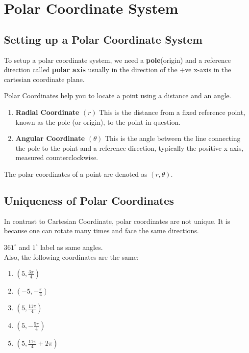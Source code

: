 \chapter{Polar Coordinate System}
\label{cha:polar-coord-syst}

\section{Setting up a Polar Coordinate System}
\label{sec:polar-coord-syst}

To setup a polar coordinate system, we need a \textbf{pole}(origin) and a
reference direction called \textbf{polar axis} usually in the direction of the
+ve x-axis in the cartesian coordinate plane.


\begin{note}
  Polar Coordinates help you to locate a point using a distance and an angle.
  \begin{enumerate}
    \item \textbf{Radial Coordinate \( (r) \) } This is the distance from a
      fixed reference point, known as the pole (or origin), to the point in
      question.
    \item \textbf{Angular Coordinate \( (\theta) \)} This is the angle between
      the line connecting the pole to the point and a reference direction,
      typically the positive x-axis, measured counterclockwise.
  \end{enumerate}

  The polar coordinates of a point are denoted as \( (r,\theta) \).
\end{note}

\section{Uniqueness of Polar Coordinates}
\label{sec:uniq-polar-coord}
In contrast to Cartesian Coordinate, polar coordinates are not unique.
It is because one can rotate many times and face the same directions.
\begin{eg}
  \( 361^{\circ} \) and \( 1^{\circ} \) label as same angles.\\
  Also, the following coordinates are the same:
  \begin{enumerate}
    \item \((5,\frac{3\pi}{4})\)
    \item \((-5,-\frac{\pi}{4})\)
    \item \((5,\frac{11\pi}{4})\)
    \item \((5,-\frac{5\pi}{4})\)
    \item \((5,\frac{11\pi}{4}+2\pi)\)
  \end{enumerate}
\end{eg}

